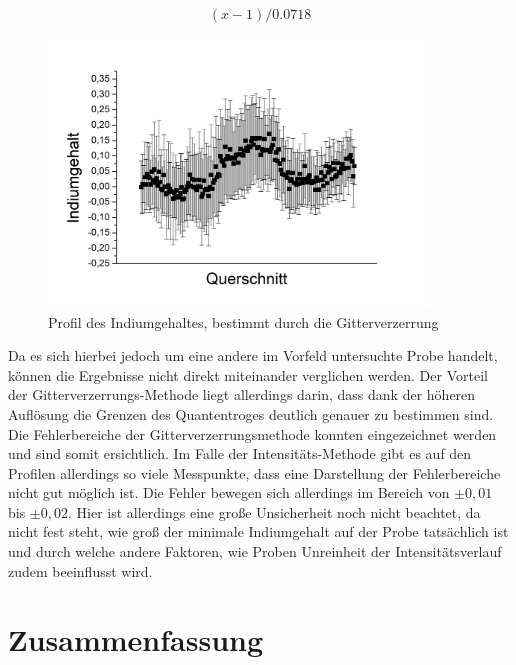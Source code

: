 \documentclass[a4paper,11pt,DIV=11]{scrartcl}
\begin{document}
\begin{align*}
	(x-1) / 0.0718
\end{align*}

\begin{figure}[H]\centering
	\includegraphics[width=0.9\textwidth]{Versuchsdaten/13/Graph01.png}
\caption{Profil des Indiumgehaltes, bestimmt durch die Gitterverzerrung}
\label{hochindium}
\end{figure}

Da es sich hierbei jedoch um eine andere im Vorfeld untersuchte Probe handelt, können die Ergebnisse nicht direkt miteinander verglichen werden. Der Vorteil der Gitterverzerrungs-Methode liegt allerdings darin, dass dank der höheren Auflösung die Grenzen des Quantentroges deutlich genauer zu bestimmen sind. \\
Die Fehlerbereiche der Gitterverzerrungsmethode konnten eingezeichnet werden und sind somit ersichtlich. Im Falle der Intensitäts-Methode gibt es auf den Profilen allerdings so viele Messpunkte, dass eine Darstellung der Fehlerbereiche nicht gut möglich ist. Die Fehler bewegen sich allerdings im Bereich von $\pm0,01$ bis $\pm0,02$. Hier ist allerdings eine große Unsicherheit noch nicht beachtet, da nicht fest steht, wie groß der minimale Indiumgehalt auf der Probe tatsächlich ist und durch welche andere Faktoren, wie Proben Unreinheit der Intensitätsverlauf zudem beeinflusst wird.

\section{Zusammenfassung}
\end{document}
